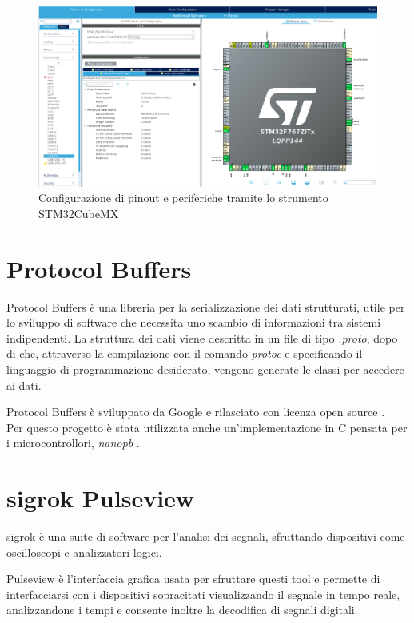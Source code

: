 \begin{figure}[H]
\centering
\includegraphics[width=\textwidth]{images/stm32cubemx.png}
\caption{Configurazione di pinout e periferiche tramite lo strumento STM32CubeMX}
\end{figure}

\section{Protocol Buffers}
Protocol Buffers è una libreria per la serializzazione dei dati strutturati, utile per lo sviluppo di software che necessita uno scambio di informazioni tra sistemi indipendenti.
La struttura dei dati viene descritta in un file di tipo \textit{.proto}, dopo di che, attraverso la compilazione con il comando \textit{protoc} e specificando il linguaggio di programmazione desiderato, vengono generate le classi per accedere ai dati. 



                
Protocol Buffers è sviluppato da Google e rilasciato con licenza open source \cite{ProtocolBuffers}. \\
Per questo progetto è stata utilizzata anche un'implementazione in C pensata per i microcontrollori, \textit{nanopb} \cite{nanopb}.

\section{sigrok Pulseview}
sigrok è una suite di software per l'analisi dei segnali, sfruttando dispositivi come oscilloscopi e analizzatori logici. 

Pulseview è l'interfaccia grafica usata per sfruttare questi tool e permette di interfacciarsi con i dispositivi sopracitati visualizzando il segnale in tempo reale, analizzandone i tempi e consente inoltre la decodifica di segnali digitali. 

